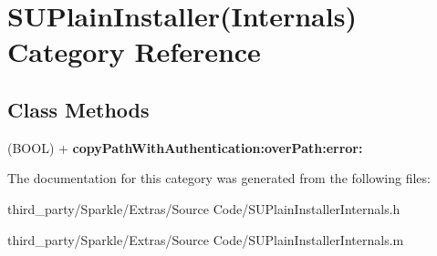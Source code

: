\hypertarget{category_s_u_plain_installer_07_internals_08}{}\section{S\+U\+Plain\+Installer(Internals) Category Reference}
\label{category_s_u_plain_installer_07_internals_08}
\subsection*{Class Methods}
\begin{DoxyCompactItemize}
\item 
\mbox{\label{category_s_u_plain_installer_07_internals_08_a121d72169fe38b8b72630cd173478aa7}} 
(B\+O\+OL) + {\bfseries copy\+Path\+With\+Authentication\+:over\+Path\+:error\+:}
\end{DoxyCompactItemize}


The documentation for this category was generated from the following files\+:\begin{DoxyCompactItemize}
\item 
third\+\_\+party/\+Sparkle/\+Extras/\+Source Code/S\+U\+Plain\+Installer\+Internals.\+h\item 
third\+\_\+party/\+Sparkle/\+Extras/\+Source Code/S\+U\+Plain\+Installer\+Internals.\+m\end{DoxyCompactItemize}

